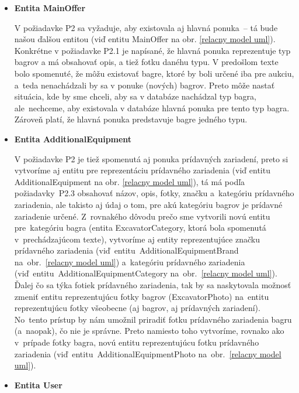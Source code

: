 \begin{itemize}
\item \textbf{Entita MainOffer}

V požiadavke P2 sa vyžaduje, aby existovala aj hlavná ponuka~-- tá bude našou ďalšou entitou (viď entitu MainOffer na obr. \ref{relacny model uml}). Konkrétne v požiadavke P2.1 je napísané, že hlavná ponuka reprezentuje typ bagrov a má obsahovať opis, a tiež fotku danéhu typu. V predošlom texte bolo spomenuté, že môžu existovať bagre, ktoré by boli určené iba pre aukciu, a~teda nenachádzali by sa v ponuke (nových) bagrov. Preto môže nastať situácia, kde by sme chceli, aby sa v databáze nachádzal typ bagra, ale~nechceme, aby existovala v databáze hlavná ponuka pre tento typ bagra. Zároveň platí, že hlavná ponuka predstavuje bagre jedného typu.

\item \textbf{Entita AdditionalEquipment}

V požiadavke P2 je tiež spomenutá aj ponuka prídavných zariadení, preto si vytvoríme aj entitu pre reprezentáciu prídavného zariadenia (viď entitu AdditionalEquipment na obr. \ref{relacny model uml}), tá má podľa požiadavky~P2.3 obsahovať názov, opis, fotky, značku a~kategóriu prídavného zariadenia, ale takisto aj údaj o tom, pre akú kategóriu bagrov je prídavné zariadenie určené. Z~rovnakého dôvodu prečo sme vytvorili novú entitu pre~kategóriu bagra (entita ExcavatorCategory, ktorá bola spomenutá v~prechádzajúcom texte), vytvoríme aj entity reprezentujúce značku prídavného zariadenia (viď~entitu~AdditionalEquipmentBrand na~obr.~\ref{relacny model uml}) a~kategóriu prídavného zariadenia (viď~entitu~AdditionalEquipmentCategory na~obr.~\ref{relacny model uml}). Ďalej čo sa týka fotiek prídavného zariadenia, tak by sa naskytovala možnosť zmeniť entitu reprezentujúcu fotky bagrov (ExcavatorPhoto) na~entitu reprezentujúcu fotky všeobecne (aj bagrov, aj prídavných zariadení). No~tento prístup by nám umožnil priradiť fotku prídavného zariadenia bagru (a~naopak), čo nie je správne. Preto namiesto toho vytvoríme, rovnako ako v~prípade fotky bagra, novú entitu reprezentujúcu fotku prídavného zariadenia (viď~entitu~AdditionalEquipmentPhoto na~obr.~\ref{relacny model uml}).

\item \textbf{Entita User}


\end{itemize}
